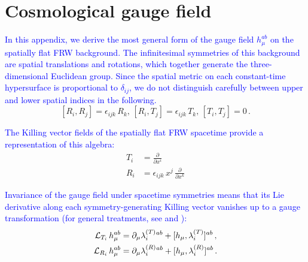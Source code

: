 \documentclass [prd,reprint,eqsecnum,nofootinbib]  {revtex4-1}
\newcommand{\corr}[1]{\textcolor{blue}{#1}}
\begin{document}
\appendix*

\section{Cosmological gauge field}



\corr{In this appendix, we derive the most general form of the gauge
field $h_\mu^{ab}$ on the spatially flat FRW background. The
infinitesimal symmetries of this background are spatial translations
and rotations, which together generate the three-dimensional
Euclidean group. Since the spatial metric on each constant-time
hypersurface is proportional to $\delta_{ij}$, we do not distinguish
carefully between upper and lower spatial indices in the following.}
\begin{equation}\label{a1}

    [R_i, R_j] = \epsilon_{ijk}\, R_k, \, [R_i, T_j] = \epsilon_{ijk}\, T_k, \, [T_i, T_j]

    =0\, .

\end{equation}

\corr{The Killing vector fields of the spatially flat FRW spacetime
provide a representation of this algebra:}
\begin{align}

T_i &= \frac{\partial}{\partial x^i}\nonumber \\ R_i

&=\epsilon_{ijk}\, x^j \,\frac{\partial}{\partial x^k}\label{a2}

\end{align}



\corr{Invariance of the gauge field under spacetime symmetries means
that its Lie derivative along each symmetry-generating Killing
vector vanishes up to a gauge transformation (for general
treatments, see \cite{Forgacs:1979zs} and
\cite{Jackiw:1979ub}):}
\begin{align}

    {\cal L}_{T_i}\,h_\mu^{ab} &= \partial_\mu \lambda^{(T)}_i{}^{ab}

    + [h_\mu,\lambda^{(T)}_i]^{ab}\,,\label{a3}\\  {\cal L}_{R_i}\,h_\mu^{ab} &= \partial_\mu \lambda^{(R)}_i{}^{ab}

    + [h_\mu,\lambda^{(R)}_i]^{ab}\,.\label{a4}

\end{align}
\end{document}
